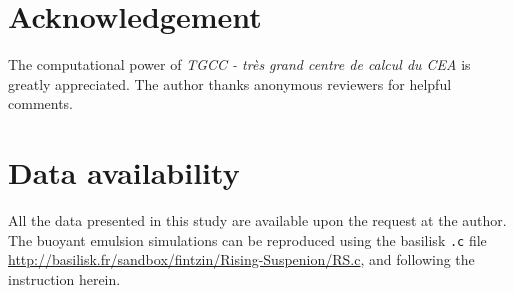 \section*{Acknowledgement}

The computational power of  \textit{TGCC - tr\`es grand centre de calcul du CEA} is greatly appreciated. 
The author thanks anonymous reviewers for helpful comments.
\section*{Data availability}

All the data presented in this study are available upon the request at the author. 
The buoyant emulsion simulations can be reproduced using the basilisk \texttt{.c} file \url{http://basilisk.fr/sandbox/fintzin/Rising-Suspenion/RS.c}, and following the instruction herein. 